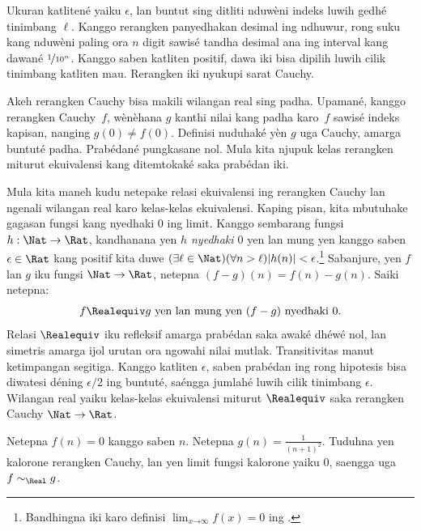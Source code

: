 \documentclass[../../../include/open-logic-section]{subfiles}
\begin{document}
Ukuran katlitené yaiku $\epsilon$, lan buntut sing ditliti nduwèni
indeks luwih gedhé tinimbang $\ell$. Kanggo rerangken panyedhakan
desimal ing ndhuwur, rong suku kang nduwèni paling ora $n$ digit
sawisé tandha desimal ana ing interval kang dawané $\nicefrac{1}{10^{n}}$.
Kanggo saben katliten positif, dawa iki bisa dipilih luwih cilik tinimbang
katliten mau. Rerangken iki nyukupi sarat Cauchy.

Akeh rerangken Cauchy bisa makili wilangan real sing padha.
Upamané, kanggo rerangken Cauchy~$f$, wènèhana $g$ kanthi nilai
kang padha karo~$f$ sawisé indeks kapisan, nanging $g(0)\neq f(0)$.
Definisi  nuduhaké yèn $g$ uga Cauchy,
amarga buntuté padha. Prabédané pungkasane nol. Mula kita njupuk
kelas rerangken miturut ekuivalensi kang ditemtokaké saka prabédan iki.

Mula kita maneh kudu netepake relasi ekuivalensi ing rerangken Cauchy lan
ngenali wilangan real karo kelas-kelas ekuivalensi. Kaping pisan, kita
mbutuhake gagasan fungsi kang nyedhaki $0$ ing limit. Kanggo sembarang
fungsi $h : \Nat \to \Rat$, kandhanana yen \emph{$h$ nyedhaki $0$} yen lan
mung yen kanggo saben $\epsilon \in \Rat$ kang positif kita duwe $(\exists
\ell \in \Nat)(\forall n > \ell)|h(n)| < \epsilon$.\footnote{Bandhingna
iki karo definisi $\lim_{x \mathord{\rightarrow}\infty}f(x) = 0$ ing
.} Sabanjure, yen $f$ lan $g$ iku fungsi
$\Nat \to \Rat$, netepna $(f-g)(n) = f(n) - g(n)$. Saiki netepna:
\[
	f \Realequiv g \text{ yen lan mung yen $(f-g)$ nyedhaki $0$}.
\]
Relasi $\Realequiv$ iku refleksif amarga prabédan saka awaké
dhéwé nol, lan simetris amarga ijol urutan ora ngowahi nilai mutlak.
Transitivitas manut ketimpangan segitiga. Kanggo katliten $\epsilon$, saben
prabédan ing rong hipotesis bisa diwatesi déning $\epsilon/2$ ing
buntuté, saéngga jumlahé luwih cilik tinimbang $\epsilon$.
Wilangan real yaiku kelas-kelas ekuivalensi miturut $\Realequiv$
saka rerangken Cauchy $\Nat \to \Rat$.

\begin{prob}
Netepna $f(n) = 0$ kanggo saben $n$. Netepna $g(n) = \frac{1}{(n+1)^2}$.
Tuduhna yen kalorone rerangken Cauchy, lan yen limit fungsi kalorone
yaiku $0$, saengga uga $f \sim_\Real g$.
\end{prob}
\end{document}

